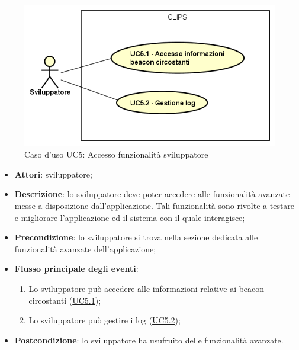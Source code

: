 \documentclass[../AnalisiDeiRequisiti.tex]{subfiles}
\begin{document}
        \begin{figure}[!h]
            \centering
            \includegraphics[scale=0.95, width=\textwidth]{img/UC5.png}
            \caption{Caso d'uso UC5: Accesso funzionalità sviluppatore}\label{fig:UC5} 
        \end{figure}
\begin{itemize}
\item \textbf{Attori}: sviluppatore;
\item \textbf{Descrizione}: lo sviluppatore deve poter accedere alle funzionalità avanzate messe a disposizione dall'applicazione. Tali funzionalità sono rivolte a testare e migliorare l'applicazione ed il sistema con il quale interagisce; 
      \item \textbf{Precondizione}: lo sviluppatore si trova nella sezione dedicata alle funzionalità avanzate dell'applicazione;

        \item \textbf{Flusso principale degli eventi}:
          \begin{enumerate}
          \item Lo sviluppatore può accedere alle informazioni relative ai beacon circostanti (\hyperlink{UC5.1}{UC5.1});
          \item Lo sviluppatore può gestire i log (\hyperlink{UC5.2}{UC5.2});

      \end{enumerate}
    \item \textbf{Postcondizione}: lo sviluppatore ha usufruito delle funzionalità avanzate.
  \end{itemize}
\hypertarget{UC5.1}{}
\end{document}
